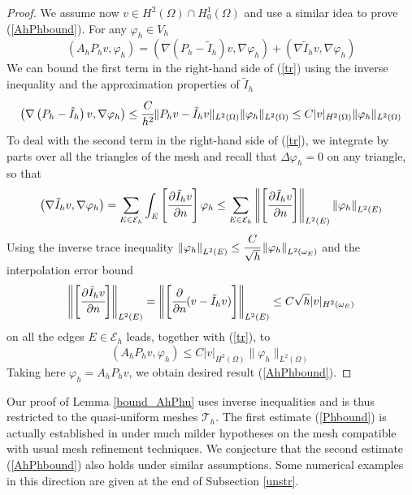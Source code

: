 \documentclass{imanum}
\begin{document}
\begin{proof}
We assume now $v\in H^2(\Omega) \cap H^1_0 (\Omega)$ and use a similar idea to prove (\ref{AhPhbound}). For any $\varphi_h\in V_h$
\begin{equation}\label{tr}
\left( A_hP_h v,\varphi_h\right)
= \left(\nabla\left(P_h-\tilde I_h\right) v ,\nabla\varphi_h\right)+\left( \nabla \tilde I_h v ,\nabla\varphi_h\right)
\end{equation}
We can bound the first term in the right-hand side of (\ref{tr}) using the inverse inequality and the approximation properties of $\tilde I_h$  
\[\left(\nabla\left(P_h-\tilde I_h\right) v ,\nabla\varphi_h\right)\leq \cfrac{C}{h^2}\| P_h v  -\tilde I_hv  \|_{L^2(\Omega)}\| \varphi_h \|_{L^2(\Omega)}\leq C| v  |_{H^2(\Omega)}\| \varphi_h \|_{L^2(\Omega)}
\]
To deal with the second term in the right-hand side of (\ref{tr}), we integrate by parts over all the triangles of the mesh and recall that $\Delta\varphi_h=0$ on any triangle, so that
\[
\left( \nabla \tilde I_h v ,\nabla\varphi_h \right)=\sum_{E \in \mathcal{E}_h}\int_{E}\left[\cfrac{\partial \tilde I_h v }{\partial n}\right]\varphi_h
\leq \sum_{E \in \mathcal{E}_h}\left\Vert\left[\cfrac{\partial \tilde I_h v }{\partial n}\right]\right\Vert_{L^2(E)}\left\Vert\varphi_h\right\Vert_{L^2(E)}
\]
Using the inverse trace inequality $\left\Vert\varphi_h\right\Vert_{L^2(E)}\leq \cfrac{C}{\sqrt{h}}\left\Vert\varphi_h\right\Vert_{L^2(\omega_E)}$ and the interpolation error bound  
$$
\left\Vert\left[\cfrac{\partial \tilde I_h v }{\partial n}\right]\right\Vert_{L^2(E)}
=\left\Vert\left[\cfrac{\partial  }{\partial n}(v-\tilde I_h v)\right]\right\Vert_{L^2(E)}
\leq C\sqrt{h}| v  |_{H^2(\omega_{E})}
$$ on all the edges $E\in \mathcal{E}_h$ leads, together with (\ref{tr}), to
$$
\left( A_hP_h v,\varphi_h\right) 
\le 
C| v  |_{H^2(\Omega)}\| \varphi_h \|_{L^2(\Omega)}
$$
Taking here $\varphi_h=A_hP_h v$, we obtain desired result (\ref{AhPhbound}).
\end{proof}

\begin{remark}
Our proof of Lemma \ref{bound_AhPhu} uses  inverse inequalities and is thus restricted to the quasi-uniform meshes $\mathcal{T}_h$. The first estimate (\ref{Phbound}) is actually established in \cite{bramble2002stability} under much milder hypotheses on the mesh compatible with usual mesh refinement techniques. We conjecture that the second estimate (\ref{AhPhbound}) also holds under similar assumptions. Some numerical examples in this direction are given at the end of Subsection \ref{unstr}.
\end{remark}
 
\end{document}
